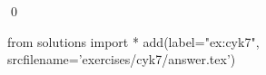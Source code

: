 
\begin{ex} 
  \label{ex:cyk7}
  
  \qed
\end{ex} 
\begin{python0}
from solutions import *
add(label="ex:cyk7",
    srcfilename='exercises/cyk7/answer.tex') 
\end{python0}
